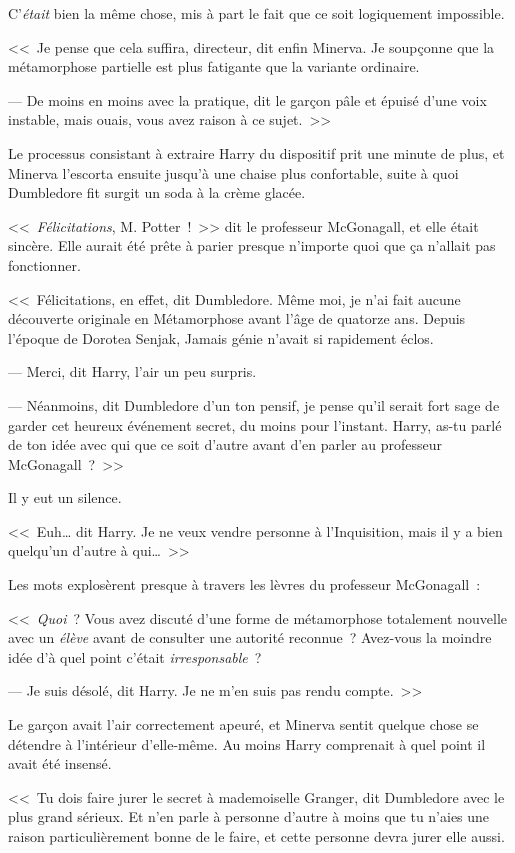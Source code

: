 C'\emph{était} bien la même chose, mis à part le fait que ce soit logiquement impossible.

<<~Je pense que cela suffira, directeur, dit enfin Minerva. Je soupçonne que la métamorphose partielle est plus fatigante que la variante ordinaire.

--- De moins en moins avec la pratique, dit le garçon pâle et épuisé d'une voix instable, mais ouais, vous avez raison à ce sujet.~>>

Le processus consistant à extraire Harry du dispositif prit une minute de plus, et Minerva l'escorta ensuite jusqu'à une chaise plus confortable, suite à quoi Dumbledore fit surgit un soda à la crème glacée.

<<~\emph{Félicitations}, M. Potter~!~>> dit le professeur McGonagall, et elle était sincère. Elle aurait été prête à parier presque n'importe quoi que ça n'allait pas fonctionner.

<<~Félicitations, en effet, dit Dumbledore. Même moi, je n'ai fait aucune découverte originale en Métamorphose avant l'âge de quatorze ans. Depuis l'époque de Dorotea Senjak, Jamais génie n'avait si rapidement éclos.

--- Merci, dit Harry, l'air un peu surpris.

--- Néanmoins, dit Dumbledore d'un ton pensif, je pense qu'il serait fort sage de garder cet heureux événement secret, du moins pour l'instant. Harry, as-tu parlé de ton idée avec qui que ce soit d'autre avant d'en parler au professeur McGonagall~?~>>

Il y eut un silence.

<<~Euh… dit Harry. Je ne veux vendre personne à l'Inquisition, mais il y a bien quelqu'un d'autre à qui…~>>

Les mots explosèrent presque à travers les lèvres du professeur McGonagall~:

<<~\emph{Quoi}~? Vous avez discuté d'une forme de métamorphose totalement nouvelle avec un \emph{élève} avant de consulter une autorité reconnue~? Avez-vous la moindre idée d'à quel point c'était \emph{irresponsable}~?

--- Je suis désolé, dit Harry. Je ne m'en suis pas rendu compte.~>>

Le garçon avait l'air correctement apeuré, et Minerva sentit quelque chose se détendre à l'intérieur d'elle-même. Au moins Harry comprenait à quel point il avait été insensé.

<<~Tu dois faire jurer le secret à mademoiselle Granger, dit Dumbledore avec le plus grand sérieux. Et n'en parle à personne d'autre à moins que tu n'aies une raison particulièrement bonne de le faire, et cette personne devra jurer elle aussi.

